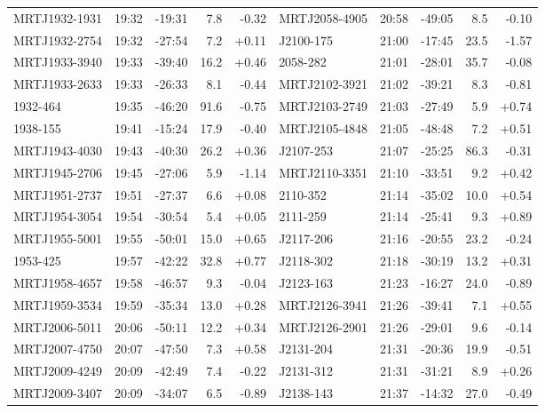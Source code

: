 \documentclass[preprint]{aastex}
\begin{document}
\begin{table}[ht]
\begin{tabular}{l|lrrr||l|lrrr}
MRTJ1932-1931 & 19:32 & -19:31 &    7.8 & -0.32 & MRTJ2058-4905 & 20:58 & -49:05 &    8.5 & -0.10 \\
MRTJ1932-2754 & 19:32 & -27:54 &    7.2 & +0.11 &  J2100-175 & 21:00 & -17:45 &   23.5 & -1.57 \\
MRTJ1933-3940 & 19:33 & -39:40 &   16.2 & +0.46 &   2058-282 & 21:01 & -28:01 &   35.7 & -0.08 \\
MRTJ1933-2633 & 19:33 & -26:33 &    8.1 & -0.44 & MRTJ2102-3921 & 21:02 & -39:21 &    8.3 & -0.81 \\
  1932-464 & 19:35 & -46:20 &   91.6 & -0.75 & MRTJ2103-2749 & 21:03 & -27:49 &    5.9 & +0.74 \\
  1938-155 & 19:41 & -15:24 &   17.9 & -0.40 & MRTJ2105-4848 & 21:05 & -48:48 &    7.2 & +0.51 \\
MRTJ1943-4030 & 19:43 & -40:30 &   26.2 & +0.36 &  J2107-253 & 21:07 & -25:25 &   86.3 & -0.31 \\
MRTJ1945-2706 & 19:45 & -27:06 &    5.9 & -1.14 & MRTJ2110-3351 & 21:10 & -33:51 &    9.2 & +0.42 \\
MRTJ1951-2737 & 19:51 & -27:37 &    6.6 & +0.08 &   2110-352 & 21:14 & -35:02 &   10.0 & +0.54 \\
MRTJ1954-3054 & 19:54 & -30:54 &    5.4 & +0.05 &   2111-259 & 21:14 & -25:41 &    9.3 & +0.89 \\
MRTJ1955-5001 & 19:55 & -50:01 &   15.0 & +0.65 &  J2117-206 & 21:16 & -20:55 &   23.2 & -0.24 \\
  1953-425 & 19:57 & -42:22 &   32.8 & +0.77 &  J2118-302 & 21:18 & -30:19 &   13.2 & +0.31 \\
MRTJ1958-4657 & 19:58 & -46:57 &    9.3 & -0.04 &  J2123-163 & 21:23 & -16:27 &   24.0 & -0.89 \\
MRTJ1959-3534 & 19:59 & -35:34 &   13.0 & +0.28 & MRTJ2126-3941 & 21:26 & -39:41 &    7.1 & +0.55 \\
MRTJ2006-5011 & 20:06 & -50:11 &   12.2 & +0.34 & MRTJ2126-2901 & 21:26 & -29:01 &    9.6 & -0.14 \\
MRTJ2007-4750 & 20:07 & -47:50 &    7.3 & +0.58 &  J2131-204 & 21:31 & -20:36 &   19.9 & -0.51 \\
MRTJ2009-4249 & 20:09 & -42:49 &    7.4 & -0.22 &  J2131-312 & 21:31 & -31:21 &    8.9 & +0.26 \\
MRTJ2009-3407 & 20:09 & -34:07 &    6.5 & -0.89 &  J2138-143 & 21:37 & -14:32 &   27.0 & -0.49 \\
\hline
\end{tabular}
\end{table}
\end{document}

